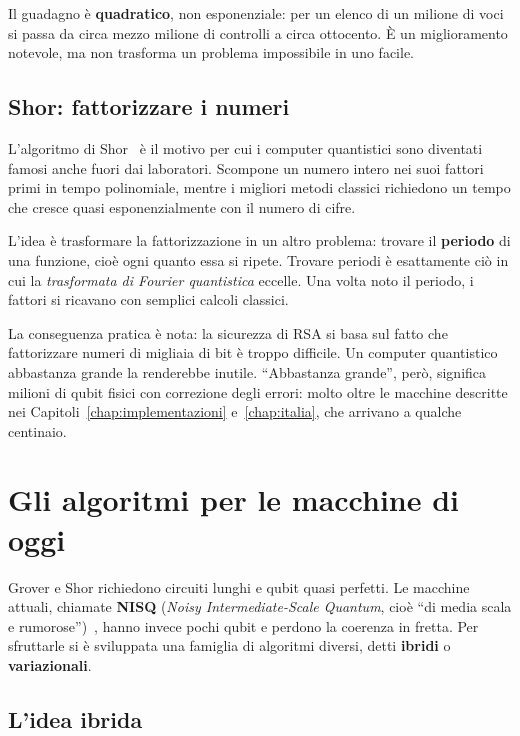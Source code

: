 Il guadagno è \textbf{quadratico}, non esponenziale: per un elenco di un milione
di voci si passa da circa mezzo milione di controlli a circa ottocento. È un
miglioramento notevole, ma non trasforma un problema impossibile in uno facile.

\subsection{Shor: fattorizzare i numeri}
\label{subsec:alg-shor}

L'algoritmo di Shor~\cite{shor1994algorithms} è il motivo per cui i computer
quantistici sono diventati famosi anche fuori dai laboratori. Scompone un
numero intero nei suoi fattori primi in tempo polinomiale, mentre i migliori
metodi classici richiedono un tempo che cresce quasi esponenzialmente con il
numero di cifre.

L'idea è trasformare la fattorizzazione in un altro problema: trovare il
\textbf{periodo} di una funzione, cioè ogni quanto essa si ripete. Trovare
periodi è esattamente ciò in cui la \textit{trasformata di Fourier quantistica}
eccelle. Una volta noto il periodo, i fattori si ricavano con semplici calcoli
classici.

La conseguenza pratica è nota: la sicurezza di RSA si basa sul fatto che
fattorizzare numeri di migliaia di bit è troppo difficile. Un computer
quantistico abbastanza grande la renderebbe inutile. ``Abbastanza grande'',
però, significa milioni di qubit fisici con correzione degli errori: molto
oltre le macchine descritte nei Capitoli~\ref{chap:implementazioni}
e~\ref{chap:italia}, che arrivano a qualche centinaio.

\section{Gli algoritmi per le macchine di oggi}
\label{sec:alg-nisq}

Grover e Shor richiedono circuiti lunghi e qubit quasi perfetti. Le macchine
attuali, chiamate \textbf{NISQ} (\textit{Noisy Intermediate-Scale Quantum},
cioè ``di media scala e rumorose'')~\cite{preskill2018quantum}, hanno invece
pochi qubit e perdono la coerenza in fretta. Per sfruttarle si è sviluppata una
famiglia di algoritmi diversi, detti \textbf{ibridi} o \textbf{variazionali}.

\subsection{L'idea ibrida}
\label{subsec:alg-ibrido}

